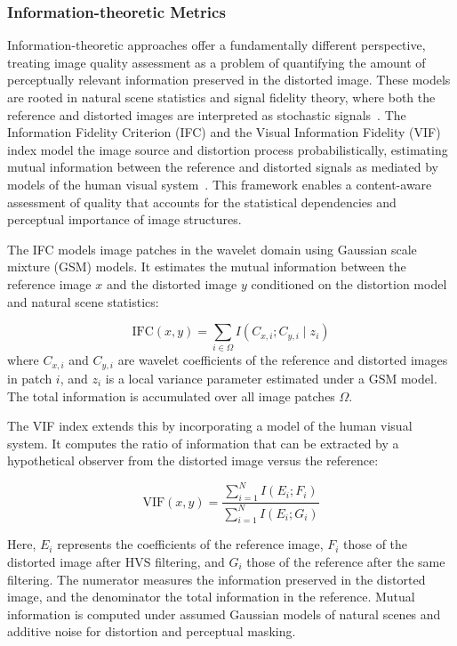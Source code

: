 \subsubsection{Information-theoretic Metrics}\label{sec:learning_based_metrics}

Information-theoretic approaches offer a fundamentally different perspective, treating image quality assessment as a problem of quantifying the amount of perceptually relevant information preserved in the distorted image. These models are rooted in natural scene statistics and signal fidelity theory, where both the reference and distorted images are interpreted as stochastic signals~\cite{sheikh2005ifc}. The Information Fidelity Criterion (IFC) and the Visual Information Fidelity (VIF) index model the image source and distortion process probabilistically, estimating mutual information between the reference and distorted signals as mediated by models of the human visual system~\cite{Sheikh2006VIF}. This framework enables a content-aware assessment of quality that accounts for the statistical dependencies and perceptual importance of image structures.

The IFC models image patches in the wavelet domain using Gaussian scale mixture (GSM) models. It estimates the mutual information between the reference image $x$ and the distorted image $y$ conditioned on the distortion model and natural scene statistics:

\begin{equation}
\text{IFC}(x, y) = \sum_{i \in \Omega} I(C_{x,i}; C_{y,i} \mid z_i)
\end{equation}
where $C_{x,i}$ and $C_{y,i}$ are wavelet coefficients of the reference and distorted images in patch $i$, and $z_i$ is a local variance parameter estimated under a GSM model. The total information is accumulated over all image patches $\Omega$.

The VIF index extends this by incorporating a model of the human visual system. It computes the ratio of information that can be extracted by a hypothetical observer from the distorted image versus the reference:

\begin{equation}
\text{VIF}(x, y) = \frac{\sum_{i=1}^{N} I(E_i; F_i)}{\sum_{i=1}^{N} I(E_i; G_i)}
\end{equation}

Here, $E_i$ represents the coefficients of the reference image, $F_i$ those of the distorted image after HVS filtering, and $G_i$ those of the reference after the same filtering. The numerator measures the information preserved in the distorted image, and the denominator the total information in the reference. Mutual information is computed under assumed Gaussian models of natural scenes and additive noise for distortion and perceptual masking.

